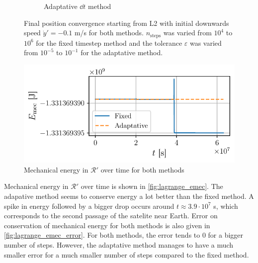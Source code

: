 \begin{figure}[h]
\begin{subfigure}{0.49\linewidth}
        \caption{Adaptative \(\dd t\) method}
        \label{fig:lagrange_conv_adapt}
    \end{subfigure}
    \caption{Final position convergence starting from L2 with initial downwards speed \(\dot y' = -0.1\) m/s for both methods. \(n_\textrm{steps}\) was varied from \(10^4\) to \(10^6\) for the fixed timestep method and the tolerance \(\varepsilon\) was varied from \(10^{-5}\) to \(10^{-1}\) for the adaptative method.}
    \label{fig:lagrange_conv}
\end{figure}

\begin{figure}
    \vspace*{-0.2cm}
    \centering
    \includegraphics[width=\linewidth]{figures/lagrange_emec.pdf}
    \caption{Mechanical energy in \(\mathcal R'\) over time for both methods}
    \label{fig:lagrange_emec}
    \vspace*{-0.5cm}
\end{figure}
Mechanical energy in \(\mathcal R'\) over time is shown in \autoref{fig:lagrange_emec}. The adapative method seems to conserve energy a lot better than the fixed method. A spike in energy followed by a bigger drop occurs around \(t \approx 3.9 \cdot 10^7\) s, which corresponds to the second passage of the satelite near Earth. Error on conservation of mechanical energy for both methods is also given in \autoref{fig:lagrange_emec_error}. For both methods, the error tends to 0 for a bigger number of steps. However, the adaptative method manages to have a much smaller error for a much smaller number of steps compared to the fixed method.
